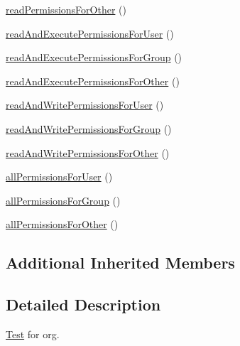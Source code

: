 \begin{DoxyCompactItemize}
\item 
\mbox{\hyperlink{classorg_1_1bovigo_1_1vfs_1_1vfs_stream_abstract_content_test_case_a24f7bb4f8eb515d166b44be50e279b92}{read\+Permissions\+For\+Other}} ()
\item 
\mbox{\hyperlink{classorg_1_1bovigo_1_1vfs_1_1vfs_stream_abstract_content_test_case_a95c84b0a7e998181eb475256a0a67273}{read\+And\+Execute\+Permissions\+For\+User}} ()
\item 
\mbox{\hyperlink{classorg_1_1bovigo_1_1vfs_1_1vfs_stream_abstract_content_test_case_a71329dcd89c006768739acc965b2b334}{read\+And\+Execute\+Permissions\+For\+Group}} ()
\item 
\mbox{\hyperlink{classorg_1_1bovigo_1_1vfs_1_1vfs_stream_abstract_content_test_case_a713e1698c5988a8b6007256ea2604a66}{read\+And\+Execute\+Permissions\+For\+Other}} ()
\item 
\mbox{\hyperlink{classorg_1_1bovigo_1_1vfs_1_1vfs_stream_abstract_content_test_case_a2b170c63c965dc3ccb045f7feb69c2a8}{read\+And\+Write\+Permissions\+For\+User}} ()
\item 
\mbox{\hyperlink{classorg_1_1bovigo_1_1vfs_1_1vfs_stream_abstract_content_test_case_a2cddeac13c503780132c9957b376b82e}{read\+And\+Write\+Permissions\+For\+Group}} ()
\item 
\mbox{\hyperlink{classorg_1_1bovigo_1_1vfs_1_1vfs_stream_abstract_content_test_case_a8d9bdccf7ce2359ba4473923f3ab0428}{read\+And\+Write\+Permissions\+For\+Other}} ()
\item 
\mbox{\hyperlink{classorg_1_1bovigo_1_1vfs_1_1vfs_stream_abstract_content_test_case_abe6d91fa637aaf11277c22ef12935612}{all\+Permissions\+For\+User}} ()
\item 
\mbox{\hyperlink{classorg_1_1bovigo_1_1vfs_1_1vfs_stream_abstract_content_test_case_a1fb7908975f38de32ec26d317d4ebcd7}{all\+Permissions\+For\+Group}} ()
\item 
\mbox{\hyperlink{classorg_1_1bovigo_1_1vfs_1_1vfs_stream_abstract_content_test_case_a43a6b8d1e8dd9650953d53ca46549a33}{all\+Permissions\+For\+Other}} ()
\end{DoxyCompactItemize}
\subsection*{Additional Inherited Members}


\subsection{Detailed Description}
\mbox{\hyperlink{class_test}{Test}} for org. 


